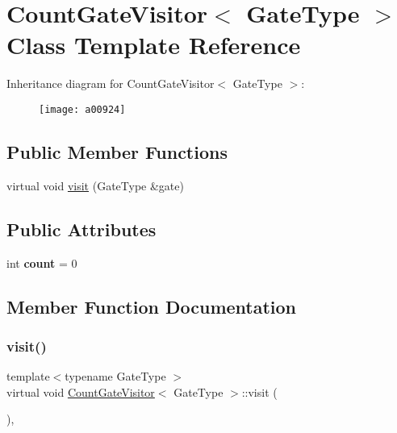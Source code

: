 \hypertarget{a00924}{}\section{Count\+Gate\+Visitor$<$ Gate\+Type $>$ Class Template Reference}
\label{a00924}
Inheritance diagram for Count\+Gate\+Visitor$<$ Gate\+Type $>$\+:\begin{figure}[H]
\begin{center}
\leavevmode
\texttt{[image: a00924]}
\end{center}
\end{figure}
\subsection*{Public Member Functions}
\begin{DoxyCompactItemize}
\item 
virtual void \hyperlink{a00924_a144f1e4e6d24c450e0a941fa650c1f48}{visit} (Gate\+Type \&gate)
\end{DoxyCompactItemize}
\subsection*{Public Attributes}
\begin{DoxyCompactItemize}
\item 
\mbox{\label{a00924_a74c1ba58befe42d9dbdbd5eb14aa46ca}} 
int {\bfseries count} = 0
\end{DoxyCompactItemize}


\subsection{Member Function Documentation}
\mbox{\label{a00924_a144f1e4e6d24c450e0a941fa650c1f48}} 
\subsubsection{\texorpdfstring{visit()}{visit()}}
{\footnotesize\ttfamily template$<$typename Gate\+Type $>$ \\
virtual void \hyperlink{a00924}{Count\+Gate\+Visitor}$<$ Gate\+Type $>$\+::visit (\begin{DoxyParamCaption}\item[{Gate\+Type \&}]{ }\end{DoxyParamCaption})\hspace{0.3cm}{\ttfamily [inline]}, {\ttfamily [virtual]}}


